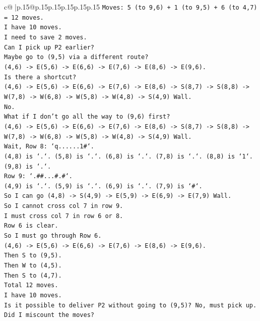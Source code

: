 \documentclass{article}
\begin{document}
{\begin{supertabular}{c@{$\;$}|p{.15\linewidth}@{}p{.15\linewidth}p{.15\linewidth}p{.15\linewidth}p{.15\linewidth}p{.15\linewidth}}
{{{\texttt{Moves: 5 (to 9,6) + 1 (to 9,5) + 6 (to 4,7) = 12 moves.} \\
\texttt{I have 10 moves.} \\
\texttt{I need to save 2 moves.} \\
\texttt{Can I pick up P2 earlier?} \\
\texttt{Maybe go to (9,5) via a different route?} \\
\texttt{(4,6) {-}> E(5,6) {-}> E(6,6) {-}> E(7,6) {-}> E(8,6) {-}> E(9,6).} \\
\texttt{Is there a shortcut?} \\
\texttt{(4,6) {-}> E(5,6) {-}> E(6,6) {-}> E(7,6) {-}> E(8,6) {-}> S(8,7) {-}> S(8,8) {-}> W(7,8) {-}> W(6,8) {-}> W(5,8) {-}> W(4,8) {-}> S(4,9) Wall.} \\
\texttt{No.} \\
\texttt{What if I don't go all the way to (9,6) first?} \\
\texttt{(4,6) {-}> E(5,6) {-}> E(6,6) {-}> E(7,6) {-}> E(8,6) {-}> S(8,7) {-}> S(8,8) {-}> W(7,8) {-}> W(6,8) {-}> W(5,8) {-}> W(4,8) {-}> S(4,9) Wall.} \\
\texttt{Wait, Row 8: `q......1\#`.} \\
\texttt{(4,8) is `.`. (5,8) is `.`. (6,8) is `.`. (7,8) is `.`. (8,8) is `1`. (9,8) is `.`.} \\
\texttt{Row 9: `.\#\#...\#.\#`.} \\
\texttt{(4,9) is `.`. (5,9) is `.`. (6,9) is `.`. (7,9) is `\#`.} \\
\texttt{So I can go (4,8) {-}> S(4,9) {-}> E(5,9) {-}> E(6,9) {-}> E(7,9) Wall.} \\
\texttt{So I cannot cross col 7 in row 9.} \\
\texttt{I must cross col 7 in row 6 or 8.} \\
\texttt{Row 6 is clear.} \\
\texttt{So I must go through Row 6.} \\
\texttt{(4,6) {-}> E(5,6) {-}> E(6,6) {-}> E(7,6) {-}> E(8,6) {-}> E(9,6).} \\
\texttt{Then S to (9,5).} \\
\texttt{Then W to (4,5).} \\
\texttt{Then S to (4,7).} \\
\texttt{Total 12 moves.} \\
\texttt{I have 10 moves.} \\
\texttt{Is it possible to deliver P2 without going to (9,5)? No, must pick up.} \\
\texttt{Did I miscount the moves?} \\
}}}
\end{supertabular}}
\end{document}
